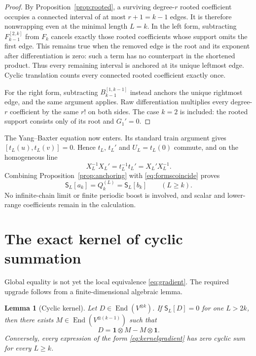 \documentclass[11pt,a4paper]{article}
\newtheorem{lemma}[theorem]{Lemma}
\theoremstyle{definition}
\theoremstyle{remark}
\newcommand{\End}{\operatorname{End}}
\newcommand{\cyc}{\mathsf{S}}
\begin{document}
\begin{proof}
By Proposition~\ref{prop:rooted}, a surviving degree-$r$ rooted coefficient occupies
a connected interval of at most $r+1=k-1$ edges.  It is therefore nonwrapping even at
the minimal length $L=k$.  In the left form, subtracting
$F_{k-1}^{[2,k]}$ from $F_k$ cancels exactly those rooted coefficients whose support
omits the first edge.  This remains true when the removed edge is the root and its
exponent after differentiation is zero: such a term has no counterpart in the shortened
product.  Thus every remaining interval is anchored at its unique leftmost edge.
Cyclic translation counts every connected rooted coefficient exactly once.

For the right form, subtracting $B_{k-1}^{[1,k-1]}$ instead anchors the unique
rightmost edge, and the same argument applies.  Raw differentiation multiplies every
degree-$r$ coefficient by the same $r!$ on both sides.  The case $k=2$ is included:
the rooted support consists only of its root and $G_1'=0$.
\end{proof}

The Yang--Baxter equation now enters.  Its standard train argument gives
$[t_L(u),t_L(v)]=0$.  Hence $t_L$, $t_L'$ and $U_L=t_L(0)$ commute, and on the
homogeneous line
\begin{equation}
 X_L^{-1}X_L'=t_L^{-1}t_L'
 =X_L'X_L^{-1}.
 \label{eq:formscoincide}
\end{equation}
Combining Proposition~\ref{prop:anchoring} with \eqref{eq:formscoincide} proves
\begin{equation}
 \cyc_L[a_k]=Q_k^{(L)}=\cyc_L[b_k]
 \qquad (L\geq k).
 \label{eq:globalsums}
\end{equation}
No infinite-chain limit or finite periodic boost is involved, and scalar and lower-range
coefficients remain in the calculation.

\section{The exact kernel of cyclic summation}

Global equality is not yet the local equivalence \eqref{eq:gradient}.  The required
upgrade follows from a finite-dimensional algebraic lemma.

\begin{lemma}[Cyclic kernel]
\label{lem:kernel}
Let $D\in\End(V^{\otimes k})$.  If $\cyc_L[D]=0$ for one $L>2k$, then there exists
$M\in\End(V^{\otimes(k-1)})$ such that
\begin{equation}
 D=\mathbf 1\otimes M-M\otimes\mathbf 1.
 \label{eq:kernelgradient}
\end{equation}
Conversely, every expression of the form \eqref{eq:kernelgradient} has zero cyclic sum
for every $L\geq k$.
\end{lemma}
\end{document}
